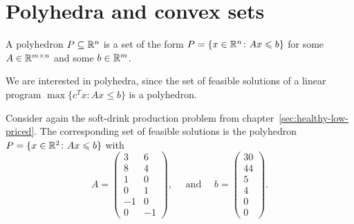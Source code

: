 \chapter{Polyhedra and convex sets}
\label{conv:cha:convex-sets}



\begin{definition}
  A polyhedron $P\subseteq\mathbb{R}^n$ is a set of the form $P = \{ x \in
   \mathbb{R}^n \colon Ax\leqslant b\}$ for some $A\in \mathbb{R}^{m\times n}$ and
  some $b \in \mathbb{R}^m$.
\end{definition}

We are interested in polyhedra, since the
 set of feasible  solutions  of a linear program $\max\{c^Tx \colon
Ax\leq b\}$ is a polyhedron. 


 
\begin{example}
  \label{cha:polyh-conv-sets}
Consider again the soft-drink production problem from chapter~\ref{sec:healthy-low-priced}. 
The corresponding set of feasible solutions is the polyhedron $P = \{x \in \mathbb{R}^2 \colon Ax \leqslant b\}$  with 
    \begin{displaymath}
      A =
      \begin{pmatrix}
        3 & 6 \\
        8 & 4 \\
        1 & 0 \\
        0 & 1 \\
        -1 & 0 \\
        0 & -1
      \end{pmatrix},
      \quad \text{ and } \quad b = 
      \begin{pmatrix}
        30 \\ 44 \\ 5 \\ 4 \\ 0 \\ 0
      \end{pmatrix}. 
    \end{displaymath}

    \begin{figure}
      \centering
\end{figure}
\end{example}
